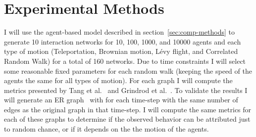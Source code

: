 \documentclass{article}
\begin{document}
\section{Experimental Methods}
I will use the agent-based model described in
section~\ref{sec:comp-methods} to generate 10 interaction networks for
10, 100, 1000, and 10000 agents and each type of motion
(Teleportation, Brownian motion, L{\'e}vy flight, and Correlated
Random Walk) for a total of 160 networks. Due to time constraints I
will select some reasonable fixed parameters for each random walk
(keeping the speed of the agents the same for all types of
motion). For each graph I will compute the metrics presented by Tang
et al.~\cite{Tang2010} and Grindrod et al.~\cite{Grindrod2011}. To
validate the results I will generate an ER graph~\cite{Erdos1960} with
for each time-step with the same number of edges as the original graph
in that time-step. I will compute the same metrics for each of these
graphs to determine if the observed behavior can be attributed just to
random chance, or if it depends on the the motion of the agents.



\end{document}
